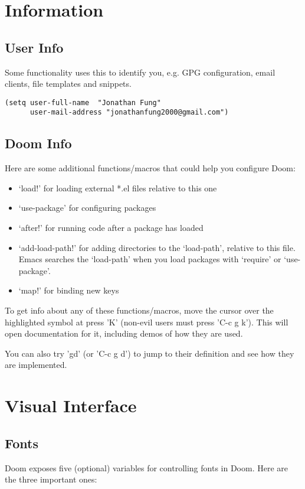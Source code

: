 \documentclass[8pt]{article}
\begin{document}
\section{Information}
\label{sec:org5f659ab}
\subsection{User Info}
\label{sec:orgcb4e00e}
Some functionality uses this to identify you, e.g. GPG configuration, email
clients, file templates and snippets.
\begin{verbatim}
(setq user-full-name  "Jonathan Fung"
      user-mail-address "jonathanfung2000@gmail.com")
\end{verbatim}

\subsection{Doom Info}
\label{sec:org17631b6}
Here are some additional functions/macros that could help you configure Doom:

\begin{itemize}
\item `load!' for loading external *.el files relative to this one
\item `use-package' for configuring packages
\item `after!' for running code after a package has loaded
\item `add-load-path!' for adding directories to the `load-path', relative to
this file. Emacs searches the `load-path' when you load packages with
`require' or `use-package'.
\item `map!' for binding new keys
\end{itemize}

To get info about any of these functions/macros, move the cursor over
the highlighted symbol at press 'K' (non-evil users must press 'C-c g k').
This will open documentation for it, including demos of how they are used.

You can also try 'gd' (or 'C-c g d') to jump to their definition and see how
they are implemented.

\section{Visual Interface}
\label{sec:orge193c28}
\subsection{Fonts}
\label{sec:org0bb0f61}
Doom exposes five (optional) variables for controlling fonts in Doom. Here
are the three important ones:
\end{document}
